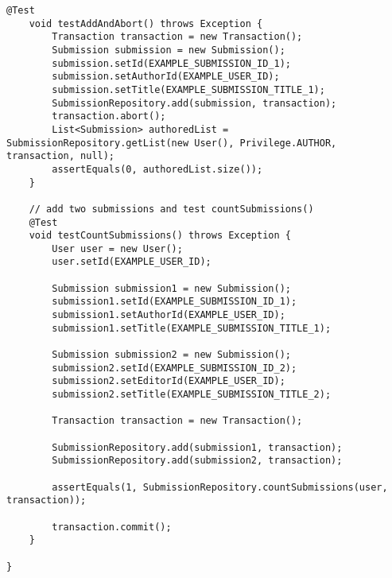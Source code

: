 \begin{lstlisting}[label={lst:SubmissionRepositoryTest},caption={SubmissionRepositoryTest.java}]
    @Test
    void testAddAndAbort() throws Exception {
        Transaction transaction = new Transaction();
        Submission submission = new Submission();
        submission.setId(EXAMPLE_SUBMISSION_ID_1);
        submission.setAuthorId(EXAMPLE_USER_ID);
        submission.setTitle(EXAMPLE_SUBMISSION_TITLE_1);
        SubmissionRepository.add(submission, transaction);
        transaction.abort();
        List<Submission> authoredList = SubmissionRepository.getList(new User(), Privilege.AUTHOR, transaction, null);
        assertEquals(0, authoredList.size());
    }

    // add two submissions and test countSubmissions()
    @Test
    void testCountSubmissions() throws Exception {
        User user = new User();
        user.setId(EXAMPLE_USER_ID);

        Submission submission1 = new Submission();
        submission1.setId(EXAMPLE_SUBMISSION_ID_1);
        submission1.setAuthorId(EXAMPLE_USER_ID);
        submission1.setTitle(EXAMPLE_SUBMISSION_TITLE_1);

        Submission submission2 = new Submission();
        submission2.setId(EXAMPLE_SUBMISSION_ID_2);
        submission2.setEditorId(EXAMPLE_USER_ID);
        submission2.setTitle(EXAMPLE_SUBMISSION_TITLE_2);

        Transaction transaction = new Transaction();

        SubmissionRepository.add(submission1, transaction);
        SubmissionRepository.add(submission2, transaction);

        assertEquals(1, SubmissionRepository.countSubmissions(user, transaction));

        transaction.commit();
    }

}
\end{lstlisting}